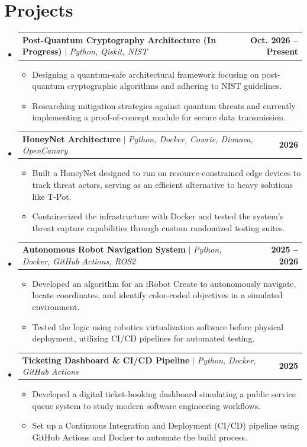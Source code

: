\documentclass[letterpaper,11pt]{article}
\makeatletter
\newcommand{\resumeItem}[1]{
  \item\small{
    {#1 \vspace{-2pt}}
  }
}
\newcommand{\resumeProjectHeading}[2]{
    \item
    \begin{tabular*}{1.001\textwidth}{l@{\extracolsep{\fill}}r}
      \small#1 & \textbf{\small #2}\\
    \end{tabular*}\vspace{-10pt}
}
\newcommand{\resumeSubHeadingListStart}{\begin{itemize}[leftmargin=0.0in, label={}]}
\newcommand{\resumeSubHeadingListEnd}{\end{itemize}}
\newcommand{\resumeItemListStart}{\begin{itemize}}
\newcommand{\resumeItemListEnd}{\end{itemize}\vspace{-10pt}}
\makeatother
\begin{document}
\section{Projects}
    \resumeSubHeadingListStart
      \resumeProjectHeading
        {\textbf{Post-Quantum Cryptography Architecture (In Progress)} $|$ \emph{Python, Qiskit, NIST}}{Oct. 2026 -- Present}
        \resumeItemListStart
          \resumeItem{Designing a quantum-safe architectural framework focusing on post-quantum cryptographic algorithms and adhering to NIST guidelines.}
          \resumeItem{Researching mitigation strategies against quantum threats and currently implementing a proof-of-concept module for secure data transmission.}
        \resumeItemListEnd

      \resumeProjectHeading
        {\textbf{HoneyNet Architecture} $|$ \emph{Python, Docker, Cowrie, Dionaea, OpenCanary}}{2026}
        \resumeItemListStart
          \resumeItem{Built a HoneyNet designed to run on resource-constrained edge devices to track threat actors, serving as an efficient alternative to heavy solutions like T-Pot.}
          \resumeItem{Containerized the infrastructure with Docker and tested the system's threat capture capabilities through custom randomized testing suites.}
        \resumeItemListEnd

      \resumeProjectHeading
        {\textbf{Autonomous Robot Navigation System} $|$ \emph{Python, Docker, GitHub Actions, ROS2}}{2025 -- 2026}
        \resumeItemListStart
          \resumeItem{Developed an algorithm for an iRobot Create to autonomously navigate, locate coordinates, and identify color-coded objectives in a simulated environment.}
          \resumeItem{Tested the logic using robotics virtualization software before physical deployment, utilizing CI/CD pipelines for automated testing.}
        \resumeItemListEnd

      \resumeProjectHeading
        {\textbf{Ticketing Dashboard \& CI/CD Pipeline} $|$ \emph{Python, Docker, GitHub Actions}}{2025}
        \resumeItemListStart
          \resumeItem{Developed a digital ticket-booking dashboard simulating a public service queue system to study modern software engineering workflows.}
          \resumeItem{Set up a Continuous Integration and Deployment (CI/CD) pipeline using GitHub Actions and Docker to automate the build process.}
        \resumeItemListEnd
    \resumeSubHeadingListEnd
\vspace{-10pt}

\end{document}

